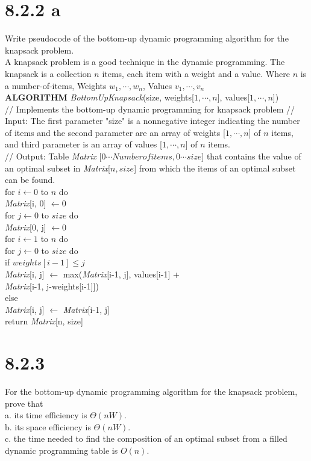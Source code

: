 \documentclass{article}
\begin{document}
\section{8.2.2 a}
Write pseudocode of the bottom-up dynamic programming algorithm for the knapsack problem. \\
\indent A knapsack problem is a good technique in the dynamic programming. The knapsack is a collection $n$ items, each item with a weight and a value. Where $n$ is a number-of-items, Weights $w_1, \cdots , w_n$, Values $v_1, \cdots , v_n$ \\
\textbf{ALGORITHM} \textit{BottomUpKnapsack}(size, weights[$1, \cdots ,n$], values[$1, \cdots ,n$]) \\
\indent // Implements the bottom-up dynamic programming for knapsack problem 
\indent // Input: The first parameter "size" is a nonnegative integer indicating the number of items and the second parameter are an array of weights [$1, \cdots, n$] of $n$ items, and third parameter is an array of values [$1, \cdots, n$] of $n$ items. \\
\indent // Output: Table \textit{Matrix} [$0 \cdots Number of items, 0 \cdots size$] that contains the value of an optimal subset in \textit{Matrix}[$n, size$] from which the items of an optimal subset can be found. \\
\indent for $i \leftarrow 0$ to $n$ do \\
\indent \indent \textit{Matrix}[i, 0] $\leftarrow 0$ \\
\indent for $j \leftarrow 0$ to $size$ do \\
\indent \indent \textit{Matrix}[0, j] $\leftarrow 0$ \\
\indent for $i \leftarrow 1$ to $n$ do \\
\indent \indent for $j \leftarrow 0$ to $size$ do \\
\indent \indent \indent if $weights[i-1] \le j$ \\
\indent \indent \indent \indent \textit{Matrix}[i, j] $\leftarrow$ max(\textit{Matrix}[i-1, j], values[i-1] + \\
\indent \indent \indent \indent \indent \indent \indent \indent \indent \textit{Matrix}[i-1, j-weights[i-1]]) \\
\indent \indent \indent else \\
\indent \indent \indent \indent \textit{Matrix}[i, j] $\leftarrow$ \textit{Matrix}[i-1, j] \\
return \textit{Matrix}[n, size]

\section{8.2.3}
For the bottom-up dynamic programming algorithm for the knapsack problem, prove that \\
a. its time efficiency is $\Theta(nW)$. \\
b. its space efficiency is $\Theta(nW)$. \\
c. the time needed to find the composition of an optimal subset from a filled
dynamic programming table is $O(n)$.
\end{document}

